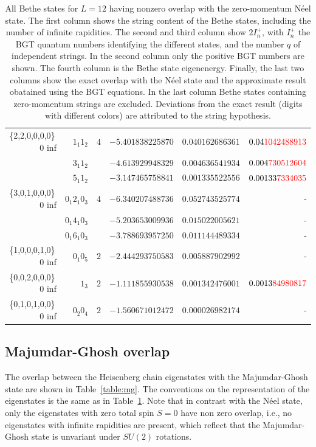 \documentclass[11pt]{iopart}
\begin{document}
\begin{table}[h]
\begin{tabular}{rrrrrr}
\midrule
\{2,2,0,0,0,0\}\, 0 inf &$1_1 1_2$ & $4$ & $-5.401838225870$ & $0.040162686361$ & $0.04{\color{red}1042488913}$\\  
&$3_1 1_2 $ & & $-4.613929948329$ & $0.004636541934$ & $0.004{\color{red}730512604}$\\
  &$5_1 1_2 $ &  & $-3.147465758841$ & $0.001335522556$ & $0.00133{\color{red}7334035}$\\
\midrule
\{3,0,1,0,0,0\}\, 0 inf &$0_1 2_1 0_3$ & $4$ & $-6.340207488736$ & $0.052743525774$ & -\\
  &$0_1 4_1 0_3$ & & $-5.203653009936$ & $0.015022005621$ & - \\
  &$0_1 6_1 0_3$ & & $-3.788693957250$ & $0.011144489334$ & - \\
\midrule
\{1,0,0,0,1,0\}\, 0 inf &$0_1 0_5$ & $2$ & $-2.444293750583$ & $0.005887902992$ & - \\
\midrule
\{0,0,2,0,0,0\}\, 0 inf &$1_3$ & $2$ & $-1.111855930538$ & $0.001342476001$ & $0.0013{\color{red}84980817}$ \\
\midrule
\{0,1,0,1,0,0\}\, 0 inf &$0_2 0_4$ & $2$ &  $-1.560671012472$ & $0.000026982174$ & - \\
\bottomrule
\end{tabular}
\caption{All Bethe states for $L=12$ having nonzero overlap with the zero-momentum N\'eel state. 
 The first column shows the string content of the Bethe states, including the number of infinite 
 rapidities. The second and third column show $2I_n^+$, with $I_n^+$ the BGT quantum numbers 
 identifying the different states, and the number $q$ of independent strings. In the second 
 column only the positive BGT numbers are shown. The fourth column is the Bethe state eigenenergy. 
 Finally, the last two columns show the exact overlap with the N\'eel state and the approximate 
 result obatained using the BGT equations. In the last column Bethe states containing zero-momentum 
 strings are excluded. Deviations from the exact result (digits with different colors) are 
 attributed to the string hypothesis. 
}
\label{table:neel}
\end{table}



\subsection{Majumdar-Ghosh overlap}
\label{app-mg}
The overlap between the Heisenberg chain eigenstates with the Majumdar-Ghosh state are shown in 
Table~\ref{table:mg}. The conventions on the representation of the eigenstates is the same as in 
Table~\ref{table:neel}. Note that in contrast with the N\'eel state, only the eigenstates with 
zero total spin $S=0$ have non zero overlap, i.e., no eigenstates with infinite rapidities are 
present, which reflect that the Majumdar-Ghosh state is unvariant under $SU(2)$ rotations. 
\end{document}
